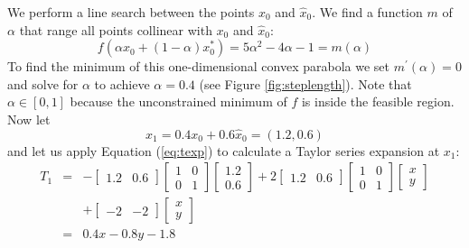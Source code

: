 We perform a line search between the points $x_0$ and $\hat{x}_0$.
We find a function $m$ of $\alpha$ that range all points collinear with $x_0$
and $\hat{x}_0$:
\[
f(\alpha x_0 + (1-\alpha)x_0^*) = 5\alpha^2 - 4\alpha -1 = m(\alpha)
\]
To find the minimum of this one-dimensional convex parabola we set
$m^\prime(\alpha) = 0$ and solve for $\alpha$ to achieve $\alpha = 0.4$
(see Figure \ref{fig:steplength}).
Note that $\alpha \in [0, 1]$ because the unconstrained minimum of $f$ is
inside the feasible region.
Now let
\[
x_1 = 0.4x_0 + 0.6\hat{x}_0 = (1.2, 0.6)
\]
and let us apply Equation (\ref{eq:texp}) to calculate a Taylor series
expansion at $x_1$:
\[
\begin{array}{rcl}
T_1 &=& -\left[
         \begin{array}{cc}
            1.2 & 0.6
         \end{array}
         \right]

         \left[
         \begin{array}{cc}
            1 & 0 \\ 0 & 1
         \end{array}
         \right]
         
         \left[
         \begin{array}{c}
             1.2 \\ [5pt] 0.6
         \end{array}
         \right]
         + 2
         \left[
         \begin{array}{cc}
            1.2 & 0.6
         \end{array}
         \right]
         
         \left[
         \begin{array}{cc}
            1 & 0 \\ 0 & 1
         \end{array}
         \right]
         
         \left[
         \begin{array}{c}
            x \\ y
         \end{array}
         \right] \\
         
     & & +
         \left[
         \begin{array}{cc}
            -2 & -2
         \end{array}
         \right]
         
         \left[
         \begin{array}{c}
            x \\ y
         \end{array}
         \right] \\ [15pt]
    &=& \displaystyle 0.4x - 0.8y - 1.8
\end{array}
\]

